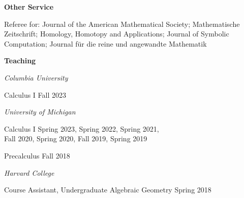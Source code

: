 \documentclass[11 pt]{letter}
\begin{document}
	\medskip
	\noindent
	\textbf{Other Service}

	Referee for: Journal of the American Mathematical Society; Mathematische Zeitschrift; Homology, Homotopy and Applications; Journal of Symbolic Computation; Journal für die reine und angewandte Mathematik

	

	\medskip
	\noindent
	\textbf{\large{Teaching}}

	\noindent \emph{Columbia University}

	Calculus I \hfill Fall 2023


	\noindent \emph{University of Michigan}


	

	Calculus I \hfill Spring 2023, Spring 2022, Spring 2021, \\ 
	\null \hfill Fall 2020, Spring 2020, Fall 2019, Spring 2019



	Precalculus \hfill Fall 2018 


	\noindent \emph{Harvard College}

	Course Assistant, Undergraduate Algebraic Geometry \hfill Spring 2018



	









	

\end{document}
